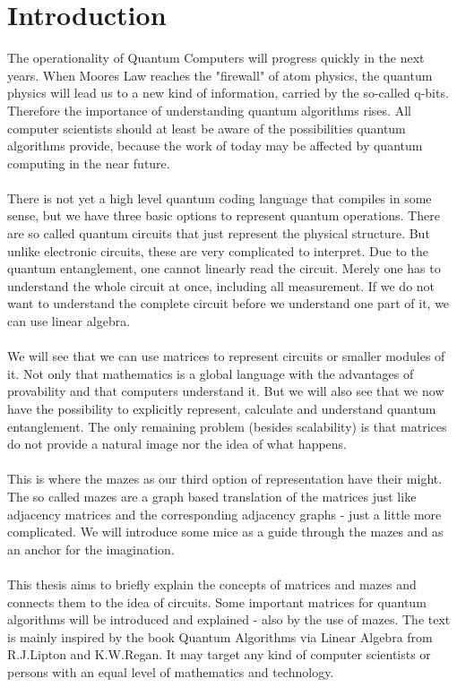 \documentclass[oneside]{thesisclass}
\begin{document}

\frontmatter
{}



\tableofcontents


\mainmatter
{}
\chapter{Introduction}
\nocite{*}
The operationality of Quantum Computers will progress quickly in the next years. 
When Moores Law reaches the "firewall" of atom physics, the quantum physics will lead us to a new kind of information, carried by the so-called q-bits. 
Therefore the importance of understanding quantum algorithms rises. 
All computer scientists should at least be aware of the possibilities quantum algorithms provide, because the work of today may be affected by quantum computing in the near future. \\
\\There is not yet a high level quantum coding language that compiles in some sense, but we have three basic options to represent quantum operations.
There are so called quantum circuits that just represent the physical structure. 
But unlike electronic circuits, these are very complicated to interpret.
Due to the quantum entanglement, one cannot linearly read the circuit. 
Merely one has to understand the whole circuit at once, including all measurement. 
If we do not want to understand the complete circuit before we understand one part of it, we can use linear algebra. \\
\\We will see that we can use matrices to represent circuits or smaller modules of it. 
Not only that mathematics is a global language with the advantages of provability and that computers understand it.
But we will also see that we now have the possibility to explicitly represent, calculate and understand quantum entanglement.
The only remaining problem (besides scalability) is that matrices do not provide a natural image nor the idea of what happens.\\
\\This is where the mazes as our third option of representation have their might.
The so called mazes are a graph based translation of the matrices just like adjacency matrices and the corresponding adjacency graphs - just a little more complicated.
We will introduce some mice as a guide through the mazes and as an anchor for the imagination.\\
\\This thesis aims to briefly explain the concepts of matrices and mazes and connects them to the idea of circuits. 
Some important matrices for quantum algorithms will be introduced and explained - also by the use of mazes.
The text is mainly inspired by the book Quantum Algorithms via Linear Algebra from R.J.Lipton and K.W.Regan.
It may target any kind of computer scientists or persons with an equal level of mathematics and technology.\\
\end{document}
